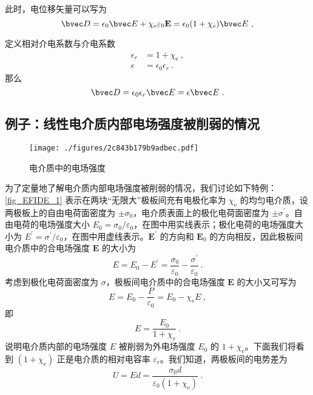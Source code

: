 此时，电位移矢量可以写为
$$
\bvec D = \epsilon_0 \bvec E + \chi_{\mathrm e} \varepsilon_{0} \mathbf E
= \epsilon_0(1+\chi_{\mathrm e}) \bvec E~,
$$

定义相对介电系数与介电系数
\begin{align}
\epsilon_r &= 1+\chi_{\mathrm e}~,\\
\epsilon &= \epsilon_0 \epsilon_r~.
\end{align}
那么
\begin{equation}
\bvec D = \epsilon_0 \epsilon_r \bvec E = \epsilon \bvec E ~.
\end{equation}

\subsection{例子：线性电介质内部电场强度被削弱的情况}
\begin{figure}[ht]
\centering
\texttt{[image: ./figures/2c843b179b9adbec.pdf]}
\caption{电介质中的电场强度} \label{fig_EFIDE_1}
\end{figure}
为了定量地了解电介质内部电场强度被削弱的情况，我们讨论如下特例：\autoref{fig_EFIDE_1} 表示在两块“无限大”极板间充有电极化率为 $\chi_\mathrm{e}$ 的均匀电介质，设两极板上的自由电荷面密度为 $\pm \sigma_0$，电介质表面上的极化电荷面密度为 $\pm \sigma^\prime$。自由电荷的电场强度大小 $E_{0}=\sigma_{0} / \varepsilon_{0}$，在图中用实线表示；极化电荷的电场强度大小为 $E^{\prime}=\sigma^{\prime} / \varepsilon_{0}$，在图中用虚线表示。$\mathbf E^\prime$ 的方向和 $\mathbf E_0$ 的方向相反，因此极板间电介质中的合电场强度 $\mathbf E $ 的大小为
\begin{equation}
E=E_{0}-E^{\prime}=\frac{\sigma_{0}}{\varepsilon_{0}}-\frac{\sigma^{\prime}}{\varepsilon_{0}}~.
\end{equation}
考虑到极化电荷面密度为 $\sigma$，极板间电介质中的合电场强度 $\mathbf E $ 的大小又可写为
\begin{equation}
E=E_{0}-\frac{P}{\varepsilon_{0}}=E_{0}-\chi_{\mathrm e} E~,
\end{equation}
即
\begin{equation} \label{eq_EFIDE_1}
E=\frac{E_{0}}{1+\chi_{\mathrm{e}}}~.
\end{equation}
说明电介质内部的电场强度 $E $ 被削弱为外电场强度 $E_0$ 的 ${1+\chi_{\mathrm{e}}}$。下面我们将看到 $({1+\chi_{\mathrm{e}}})$ 正是电介质的相对电容率 $\varepsilon_\mathrm{r}$。我们知道，两极板间的电势差为
\begin{equation}
U=E d=\frac{\sigma_{0} d}{\varepsilon_{0}\left(1+\chi_{\mathrm e}\right)}~.
\end{equation}
